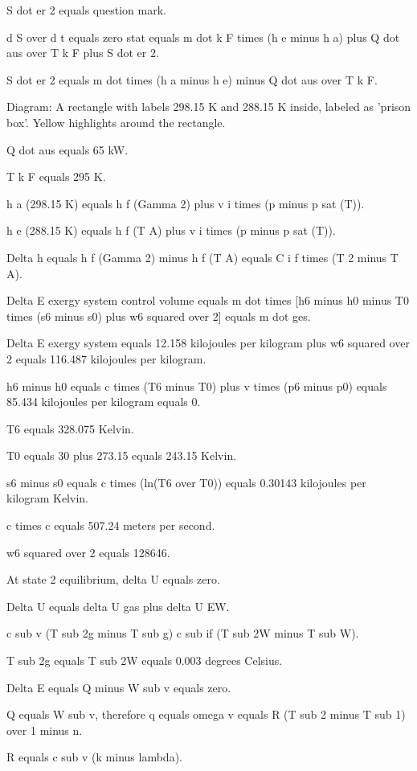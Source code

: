 S dot er 2 equals question mark.

d S over d t equals zero stat equals m dot k F times (h e minus h a) plus Q dot aus over T k F plus S dot er 2.

S dot er 2 equals m dot times (h a minus h e) minus Q dot aus over T k F.

Diagram: A rectangle with labels 298.15 K and 288.15 K inside, labeled as 'prison box'. Yellow highlights around the rectangle.

Q dot aus equals 65 kW.

T k F equals 295 K.

h a (298.15 K) equals h f (Gamma 2) plus v i times (p minus p sat (T)).

h e (288.15 K) equals h f (T A) plus v i times (p minus p sat (T)).

Delta h equals h f (Gamma 2) minus h f (T A) equals C i f times (T 2 minus T A).

Delta E exergy system control volume equals m dot times [h6 minus h0 minus T0 times (s6 minus s0) plus w6 squared over 2] equals m dot ges.

Delta E exergy system equals 12.158 kilojoules per kilogram plus w6 squared over 2 equals 116.487 kilojoules per kilogram.

h6 minus h0 equals c times (T6 minus T0) plus v times (p6 minus p0) equals 85.434 kilojoules per kilogram equals 0.

T6 equals 328.075 Kelvin.

T0 equals 30 plus 273.15 equals 243.15 Kelvin.

s6 minus s0 equals c times (ln(T6 over T0)) equals 0.30143 kilojoules per kilogram Kelvin.

c times c equals 507.24 meters per second.

w6 squared over 2 equals 128646.

At state 2 equilibrium, delta U equals zero.

Delta U equals delta U gas plus delta U EW.

c sub v (T sub 2g minus T sub g) c sub if (T sub 2W minus T sub W).

T sub 2g equals T sub 2W equals 0.003 degrees Celsius.

Delta E equals Q minus W sub v equals zero.

Q equals W sub v, therefore q equals omega v equals R (T sub 2 minus T sub 1) over 1 minus n.

R equals c sub v (k minus lambda).

